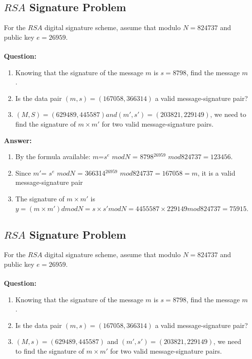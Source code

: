 \documentclass[paper=a4, fontsize=11pt]{scrartcl} %
\numberwithin{equation}{section} %
\numberwithin{figure}{section} %
\numberwithin{table}{section} %
\begin{document}
\subsection{$RSA$ Signature Problem \uppercase\expandafter{}}

For the $RSA$ digital signature scheme, assume that modulo $N = 824737$ and public key $e = 26959$.
\\
\\
\textbf{Question:}
\begin{enumerate}
\item Knowing that the signature of the message $m$ is $s = 8798$, find the message $m$.
\item Is the data pair $(m, s) = (167058, 366314)$ a valid message-signature pair?
\item $(M,S) = (629489, 445587) and (m', s') = (203821,229149)$, we need to find the signature of $m \times m'$ for two valid message-signature pairs.
\end{enumerate}

\textbf{Answer:}
\begin{enumerate}
\item By the formula available: $m$=$s^e$ $mod N$ = $8798$$^{26959}$ $mod 824737 = 123456$.
\item Since $m'$= $s^e$ $mod N$ = 366314$^{26959}$ $mod 824737 = 167058 = m$, it is a valid message-signature pair
\item The signature of $m \times m'$ is $y = (m \times m') d mod N = s \times s' mod N = 4455587 \times 229149 mod 824737 = 75915$.
\end{enumerate}


\subsection{$RSA$ Signature Problem \uppercase\expandafter{}}

For the $RSA$ digital signature scheme, assume that modulo $N = 824737$ and public key $e = 26959$.
\\
\\
\textbf{Question:}
\begin{enumerate}
\item Knowing that the signature of the message $m$ is $s = 8798$, find the message $m$.
\item Is the data pair $(m, s) = (167058, 366314)$ a valid message-signature pair?
\item $(M, s) = (629489, 445587)$ and $(m', s') = (203821,229149)$, we need to find the signature of $m \times m'$ for two valid message-signature pairs.
\end{enumerate}
\end{document}
